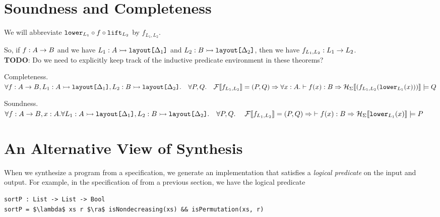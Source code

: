 \documentclass[10pt]{article}
\begin{document}
\section{Soundness and Completeness}

We will abbreviate $\textnormal{\texttt{lower}}_{L_1} \circ f \circ \textnormal{\texttt{lift}}_{L_2}$ by $f_{L_1,L_2}$.

So, if $f : A \rightarrow B$ and we have $L_1 : A \rightarrowtail \textnormal{\texttt{layout[$\Delta_1$]}}$ and $L_2 : B \rightarrowtail \textnormal{\texttt{layout[$\Delta_2$]}}$, then
we have $f_{L_1,L_2} : L_1 \rightarrow L_2$.
\\

\textbf{TODO}: Do we need to explicitly keep track of the inductive predicate environment in these theorems?

\begin{theorem} Completeness. %
  \\
  $\forall f : A \rightarrow B, L_1 : A \rightarrowtail \textnormal{\texttt{layout[$\Delta_1$]}}, L_2 : B \rightarrowtail \textnormal{\texttt{layout[$\Delta_2$]}}.\\
  ~~~\forall P, Q.\\
  ~~~\mathcal{F}\llbracket f_{L_1,L_2}\rrbracket = (P, Q) \Rightarrow \forall x : A. \vdash f(x) : B \Rightarrow \mathcal{H}_{\Sigma}\llbracket(f_{L_1,L_2}(\textnormal{\texttt{lower}}_{L_1}(x)))\rrbracket \models Q$
\end{theorem}

\begin{theorem} Soundness.\\
  $\forall f : A \rightarrow B, x : A.\forall L_1 : A \rightarrowtail \textnormal{\texttt{layout[$\Delta_1$]}}, L_2 : B \rightarrowtail \textnormal{\texttt{layout[$\Delta_2$]}}.\\
  ~~~\forall P, Q.\\
  ~~~\; \mathcal{F}\llbracket f_{L_1,L_2}\rrbracket = (P, Q) \Rightarrow\; \vdash f(x) : B \Rightarrow \mathcal{H}_{\Sigma}\llbracket\textnormal{\texttt{lower}}_{L_1}(x)\rrbracket \models P$
\end{theorem}

\section{An Alternative View of Synthesis}

When we synthesize a program from a specification, we generate an implementation that satisfies a \textit{logical predicate} on the
input and output. For example, in the specification of  from a previous section, we have the logical predicate

\begin{lstlisting}
sortP : List -> List -> Bool
sortP = $\lambda$ xs r $\ra$ isNondecreasing(xs) && isPermutation(xs, r)
\end{lstlisting}
\end{document}
